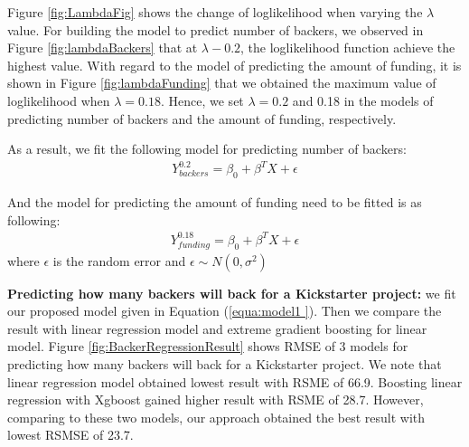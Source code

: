 Figure \ref{fig:LambdaFig} shows the change of loglikelihood when varying the $\lambda$ value. For building the model to predict number of backers, we observed in Figure \ref{fig:lambdaBackers} that at $\lambda-0.2$, the loglikelihood function achieve the highest value. With regard to the model of predicting the amount of funding, it is shown in Figure \ref{fig:lambdaFunding} that we obtained the maximum value of loglikelihood when $\lambda = 0.18$. Hence, we set $\lambda = 0.2$ and 0.18 in the models of predicting number of backers and the amount of funding, respectively.

As a result, we fit the following model for predicting number of backers:
\begin{equation}
\label{equa:model1 }
\begin{aligned}
	Y_{backers}^{0.2} = \beta_0 + \beta^TX + \epsilon 
\end{aligned}
\end{equation}

And the model for predicting the amount of funding need to be fitted is as following:
\begin{equation}
\label{equa:model2}
\begin{aligned}
	Y_{funding}^{0.18} = \beta_0 + \beta^TX + \epsilon
\end{aligned}
\end{equation}
where $\epsilon$ is the random error and $\epsilon\sim N(0, \sigma^2)$ 

\textbf{Predicting how many backers will back for a Kickstarter project:} we fit our proposed model given in Equation (\ref{equa:model1 }). Then we compare the result with linear regression model and extreme gradient boosting for linear model. Figure \ref{fig:BackerRegressionResult} shows RMSE of 3 models for predicting how many backers will back for a Kickstarter project. We note that linear regression model obtained lowest result with RSME of 66.9. Boosting linear regression with Xgboost gained higher result with RSME of 28.7. However, comparing to these two models, our approach obtained the best result with lowest RSMSE of 23.7.


